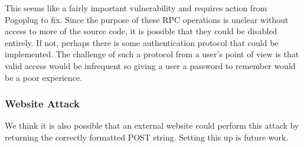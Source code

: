 This seems like a fairly important vulnerability and requires action from Pogoplug to fix.  Since the purpose of these RPC operations is unclear without access to more of the source code, it is possible that they could be disabled entirely.  If not, perhaps there is some authentication protocol that could be implemented.  The challenge of such a protocol from a user's point of view is that valid access would be infrequent so giving a user a password to remember would be a poor experience.


\subsubsection{Website Attack}
We think it is also possible that an external website could perform this attack by returning the correctly formatted POST string.  Setting this up is future work.


